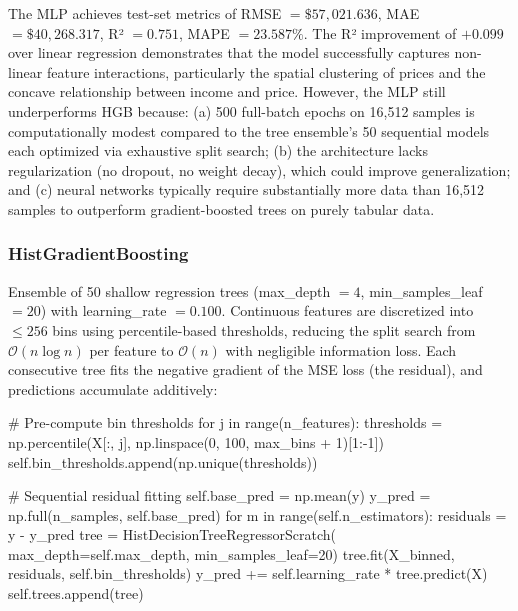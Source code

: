 The MLP achieves test-set metrics of RMSE $= \$57{,}021.636$, MAE $= \$40{,}268.317$, R² $= 0.751$, MAPE $= 23.587\%$. The R² improvement of $+0.099$ over linear regression demonstrates that the model successfully captures non-linear feature interactions, particularly the spatial clustering of prices and the concave relationship between income and price. However, the MLP still underperforms HGB because: (a) 500 full-batch epochs on 16,512 samples is computationally modest compared to the tree ensemble's 50 sequential models each optimized via exhaustive split search; (b) the architecture lacks regularization (no dropout, no weight decay), which could improve generalization; and (c) neural networks typically require substantially more data than 16,512 samples to outperform gradient-boosted trees on purely tabular data.

\subsubsection{HistGradientBoosting}
Ensemble of 50 shallow regression trees (max\_depth $= 4$, min\_samples\_leaf $= 20$) with learning\_rate $= 0.100$. Continuous features are discretized into $\le 256$ bins using percentile-based thresholds, reducing the split search from $\mathcal{O}(n \log n)$ per feature to $\mathcal{O}(n)$ with negligible information loss. Each consecutive tree fits the negative gradient of the MSE loss (the residual), and predictions accumulate additively:

\begin{pythoncode}[caption={HGB: binning + sequential tree fitting}]
# Pre-compute bin thresholds
for j in range(n_features):
    thresholds = np.percentile(X[:, j],
        np.linspace(0, 100, max_bins + 1)[1:-1])
    self.bin_thresholds.append(np.unique(thresholds))

# Sequential residual fitting
self.base_pred = np.mean(y)
y_pred = np.full(n_samples, self.base_pred)
for m in range(self.n_estimators):
    residuals = y - y_pred
    tree = HistDecisionTreeRegressorScratch(
        max_depth=self.max_depth, min_samples_leaf=20)
    tree.fit(X_binned, residuals, self.bin_thresholds)
    y_pred += self.learning_rate * tree.predict(X)
    self.trees.append(tree)
\end{pythoncode}

